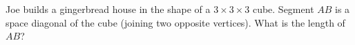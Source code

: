 Joe builds a gingerbread house in the shape of a $3\times3\times3$ cube. Segment $AB$ is a space diagonal of the cube (joining two opposite vertices). What is the length of $AB$?
